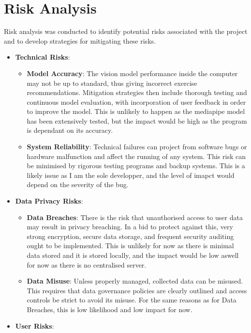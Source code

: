 \section{Risk Analysis}
    Risk analysis was conducted to identify potential risks associated with the project and to develop strategies for mitigating these risks.
    \begin{itemize}
        \item \textbf{Technical Risks}:
            \begin{itemize}
                \item \textbf{Model Accuracy}: The vision model performance inside the computer may not be up to standard, thus giving incorrect exercise recommendations. Mitigation strategies then include thorough testing and continuous model evaluation, with incorporation of user feedback in order to improve the model. This is unlikely to happen as the mediapipe model has been extensively tested, but the impact would be high as the program is dependant on its accuracy.
                \item \textbf{System Reliability}: Technical failures can project from software bugs or hardware malfunction and affect the running of any system. This risk can be minimised by rigorous testing programs and backup systems. This is a likely issue as I am the sole developper, and the level of imapct would depend on the severity of the bug.
            \end{itemize}
        \item \textbf{Data Privacy Risks}:
            \begin{itemize}
                \item \textbf{Data Breaches}: There is the risk that unauthorised access to user data may result in privacy breaching. In a bid to protect against this, very strong encryption, secure data storage, and frequent security auditing ought to be implemented. This is unlikely for now as there is minimal data stored and it is stored locally, and the impact would be low aswell for now as there is no centralised server. 
                \item \textbf{Data Misuse}: Unless properly managed, collected data can be misused. This requires that data governance policies are clearly outlined and access controls be strict to avoid its misuse. For the same reasons as for Data Breaches, this is low likelihood and low impact for now.
            \end{itemize}
        \item \textbf{User Risks}:

\end{itemize}

